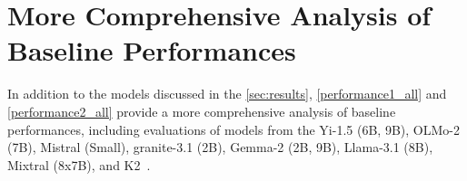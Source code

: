 \section{More Comprehensive Analysis of Baseline Performances}
\label{appendix: all results}
In addition to the models discussed in the \autoref{sec:results},  
 \autoref{performance1_all} and \autoref{performance2_all} provide a more comprehensive analysis of baseline performances, including evaluations of models from the Yi-1.5 (6B, 9B), OLMo-2 (7B), Mistral (Small), granite-3.1 (2B), Gemma-2 (2B, 9B), Llama-3.1 (8B), Mixtral (8x7B), and K2~\citep{liu2025llm360k2building65b}.

